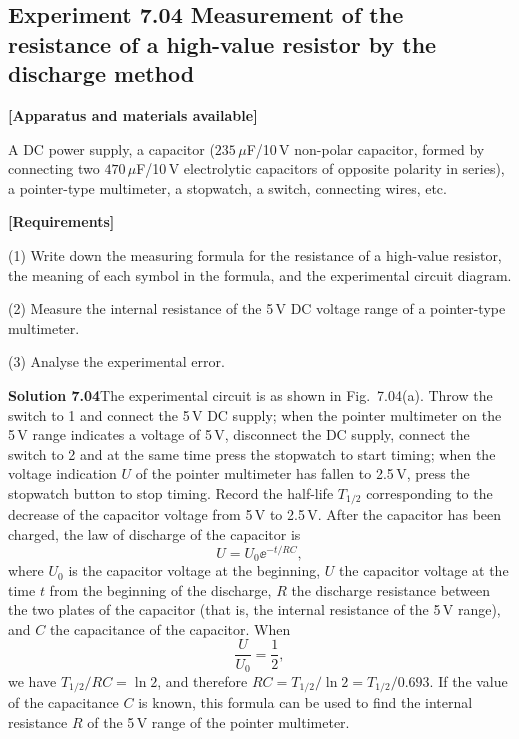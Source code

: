 \subsection*{Experiment 7.04 \quad Measurement of the resistance of a high-value resistor by the discharge method}

\textbf{[Apparatus and materials available]}

A DC power supply, a capacitor ($235\,\mu$F/10\,V non-polar capacitor, formed by connecting two $470\,\mu$F/10\,V electrolytic capacitors of opposite polarity in series), a pointer-type multimeter, a stopwatch, a switch, connecting wires, etc.

\textbf{[Requirements]}

(1) Write down the measuring formula for the resistance of a high-value resistor, the meaning of each symbol in the formula, and the experimental circuit diagram.

(2) Measure the internal resistance of the 5\,V DC voltage range of a pointer-type multimeter.

(3) Analyse the experimental error.

\textbf{Solution 7.04}\quad The experimental circuit is as shown in Fig.~7.04(a). Throw the switch to 1 and connect the 5\,V DC supply; when the pointer multimeter on the 5\,V range indicates a voltage of 5\,V, disconnect the DC supply, connect the switch to 2 and at the same time press the stopwatch to start timing; when the voltage indication $U$ of the pointer multimeter has fallen to 2.5\,V, press the stopwatch button to stop timing. Record the half-life $T_{1/2}$ corresponding to the decrease of the capacitor voltage from 5\,V to 2.5\,V. After the capacitor has been charged, the law of discharge of the capacitor is
\[
U=U_0\ee^{-t/RC},
\]
where $U_0$ is the capacitor voltage at the beginning, $U$ the capacitor voltage at the time $t$ from the beginning of the discharge, $R$ the discharge resistance between the two plates of the capacitor (that is, the internal resistance of the 5\,V range), and $C$ the capacitance of the capacitor. When
\[
\frac{U}{U_0}=\frac{1}{2},
\]
we have $T_{1/2}/RC=\ln 2$, and therefore $RC=T_{1/2}/\ln 2=T_{1/2}/0.693$. If the value of the capacitance $C$ is known, this formula can be used to find the internal resistance $R$ of the 5\,V range of the pointer multimeter.

